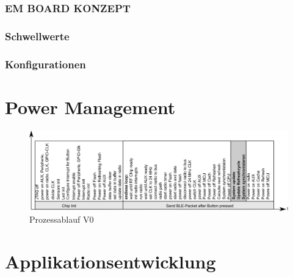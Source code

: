 \subsubsection*{EM BOARD KONZEPT}
\subsubsection*{Schwellwerte}
\subsubsection*{Konfigurationen}



\section{Power Management}





%
%
%
%
%


\begin{figure}
  \includegraphics[width=1.0\textwidth]{../ressources/SimpleLink/V0Sendeablauf.png}
  \caption{Prozessablauf V0}
\end{figure}




\section{Applikationsentwicklung}









